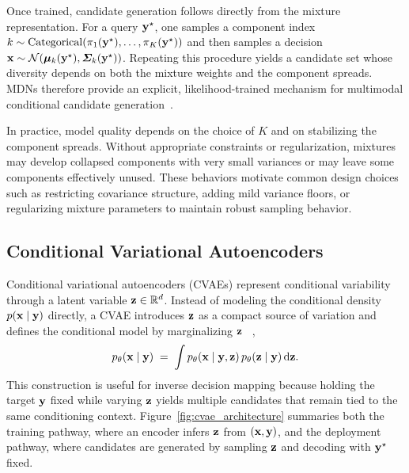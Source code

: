 Once trained, candidate generation follows directly from the mixture representation. For a query $\mathbf{y}^\star$, one samples a component index
$k \sim \mathrm{Categorical}(\pi_1(\mathbf{y}^\star),\dots,\pi_K(\mathbf{y}^\star))$
and then samples a decision
$\mathbf{x}\sim\mathcal{N}(\boldsymbol{\mu}_k(\mathbf{y}^\star),\boldsymbol{\Sigma}_k(\mathbf{y}^\star))$.
Repeating this procedure yields a candidate set whose diversity depends on both the mixture weights and the component spreads. MDNs therefore provide an explicit, likelihood-trained mechanism for multimodal conditional candidate generation~\cite{bishop1994mixture}.

In practice, model quality depends on the choice of $K$ and on stabilizing the component spreads. Without appropriate constraints or regularization, mixtures may develop collapsed components with very small variances or may leave some components effectively unused. These behaviors motivate common design choices such as restricting covariance structure, adding mild variance floors, or regularizing mixture parameters to maintain robust sampling behavior.



\subsection{Conditional Variational Autoencoders}\label{sec:cvae}


Conditional variational autoencoders (CVAEs) represent conditional variability through a latent variable $\mathbf{z}\in\mathbb{R}^d$. Instead of modeling the conditional density $p(\mathbf{x}\mid\mathbf{y})$ directly, a CVAE introduces $\mathbf{z}$ as a compact source of variation and defines the conditional model by marginalizing $\mathbf{z}$ ~\cite{Sohn2015CVAE},
\begin{equation}
  p_\theta(\mathbf{x}\mid\mathbf{y})
  \;=\;
  \int p_\theta(\mathbf{x}\mid\mathbf{y},\mathbf{z})\,p_\theta(\mathbf{z}\mid\mathbf{y})\,\mathrm{d}\mathbf{z}.
  \label{eq:cvae_marginal}
\end{equation}
This construction is useful for inverse decision mapping because holding the target $\mathbf{y}$ fixed while varying $\mathbf{z}$ yields multiple candidates that remain tied to the same conditioning context. Figure~\ref{fig:cvae_architecture} summaries both the training pathway, where an encoder infers $\mathbf{z}$ from $(\mathbf{x},\mathbf{y})$, and the deployment pathway, where candidates are generated by sampling $\mathbf{z}$ and decoding with $\mathbf{y}^\star$ fixed.


